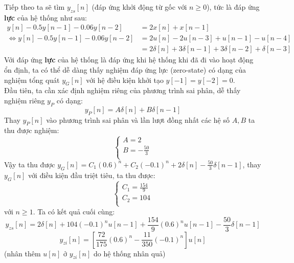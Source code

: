 \documentclass{article}
\begin{document}
Tiếp theo ta sẽ tìm $y_{zs}[n]$ (đáp ứng khởi động từ gốc với $n\geq0$), tức là đáp ứng \textbf{lực} của hệ thống như sau:
\begin{equation*}
\begin{split}
    y[n]-0.5y[n-1]-0.06y[n-2]&=2x[n]+x[n-1] \\ \Leftrightarrow y[n]-0.5y[n-1]-0.06y[n-2]&=2u[n]-2u[n-3]+u[n-1]-u[n-4] \\
    &=2\delta[n]+3\delta[n-1]+3\delta[n-2]+\delta[n-3]
\end{split}
\end{equation*}
Với đáp ứng \textbf{lực} của hệ thống là đáp ứng khi hệ thống khi đã đi vào hoạt động ổn định, ta có thể dễ dàng thấy nghiệm đáp ứng lực (zero-state) có dạng của nghiệm tổng quát $y_{G}[n]$ với hệ điều kiện khởi tạo $y[-1]=y[-2]=0$.
\\ Đầu tiên, ta cần xác định nghiệm riêng của phương trình sai phân, dễ thấy nghiệm riêng $y_{P}$ có dạng:
$$y_{P}[n]=A\delta[n]+B\delta[n-1]$$
Thay $y_{P}[n]$ vào phương trình sai phân và lần lượt đồng nhất các hệ số $A, B$ ta thu được nghiệm:
$$\begin{cases*}
    A = 2 \\
    B = -\frac{50}{3} \\
\end{cases*}$$
Vậy ta thu được $y_{G}[n]=C_{1}(0.6)^{n}+C_{2}(-0.1)^{n}+2\delta[n]-\frac{50}{3}\delta[n-1]$, thay $y_{G}[n]$ với điều kiện đầu triệt tiêu, ta thu được:
\begin{equation*}
    \begin{cases}
        C_{1} = \frac{154}{9} \\
        C_{2} = 104 \\
    \end{cases}
\end{equation*}
với $n\geq1$.
Ta có kết quả cuối cùng:
$$y_{zs}[n]= 2\delta[n]+104(-0.1)^{n}u[n-1]+\frac{154}{9}(0.6)^{n}u[n-1]-\frac{50}{3}\delta[n-1]$$
$$y_{zi}[n]= \left[\frac{72}{175}(0.6)^{n}-\frac{11}{350}(-0.1)^{n}\right]u[n]$$
(nhân thêm $u[n]$ ở $y_{zi}[n]$ do hệ thống nhân quả)
\end{document}
